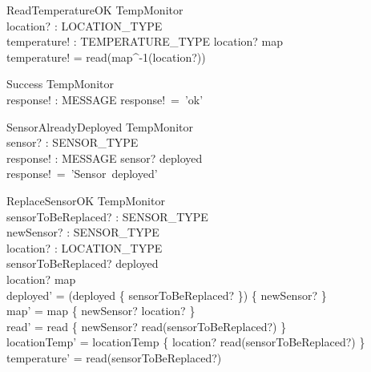\documentclass[12pt]{article}
\begin{document}
		
		\begin{schema}{ReadTemperatureOK}
			\Xi TempMonitor\\
			location? : LOCATION\_TYPE\\
			temperature! : TEMPERATURE\_TYPE
			\where
			location? \in \ran map\\
			temperature! = read(map^{-1}(location?))\\
		\end{schema}
		
		
	
		\begin{schema}{Success}
			\Xi TempMonitor\\
			response! : MESSAGE
			\where
			response!~=~'ok'\\
		\end{schema}
		
		
		
		\begin{schema}{SensorAlreadyDeployed}
			\Xi TempMonitor\\
			sensor? : SENSOR\_TYPE\\
			response! : MESSAGE
			\where
			sensor? \in deployed\\
			response!~=~'Sensor~deployed'\\
		\end{schema}
		
	
       \begin{schema}{ReplaceSensorOK}
              \Delta TempMonitor\\
              sensorToBeReplaced? : SENSOR\_TYPE\\
               newSensor? : SENSOR\_TYPE\\
               location? : LOCATION\_TYPE\\
                \where
                sensorToBeReplaced? \in deployed\\
                location? \notin \ran map\\
               deployed' = (deployed \setminus \{ sensorToBeReplaced? \}) \cup \{ newSensor? \}\\
              map' = map \oplus \{ newSensor? \mapsto location? \}\\
              read' = read \oplus \{ newSensor? \mapsto read(sensorToBeReplaced?) \}\\
              locationTemp' = locationTemp \oplus \{ location? \mapsto read(sensorToBeReplaced?) \}\\
              temperature' = read(sensorToBeReplaced?) 
   \end{schema}
\end{document}
